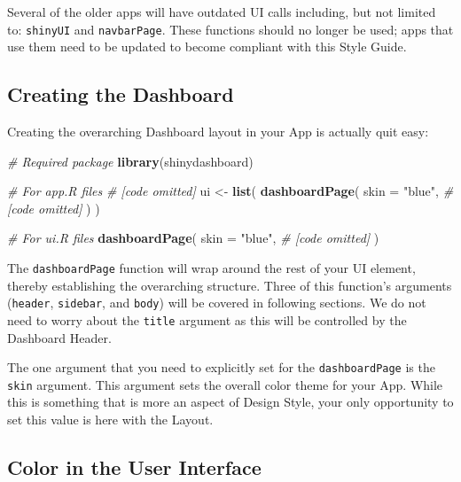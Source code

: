 \documentclass[
]{book}
\newenvironment{Shaded}{\begin{snugshade}}{\end{snugshade}}
\newcommand{\CommentTok}[1]{\textcolor[rgb]{0.56,0.35,0.01}{\textit{#1}}}
\newcommand{\DataTypeTok}[1]{\textcolor[rgb]{0.13,0.29,0.53}{#1}}
\newcommand{\KeywordTok}[1]{\textcolor[rgb]{0.13,0.29,0.53}{\textbf{#1}}}
\newcommand{\NormalTok}[1]{#1}
\newcommand{\StringTok}[1]{\textcolor[rgb]{0.31,0.60,0.02}{#1}}
\begin{document}
Several of the older apps will have outdated UI calls including, but not limited to: \texttt{shinyUI} and \texttt{navbarPage}. These functions should no longer be used; apps that use them need to be updated to become compliant with this Style Guide.

\hypertarget{creating-the-dashboard-1}{%
\subsection{Creating the Dashboard}\label{creating-the-dashboard-1}}

Creating the overarching Dashboard layout in your App is actually quit easy:

\begin{Shaded}
\begin{Highlighting}[]
\CommentTok{# Required package}
\KeywordTok{library}\NormalTok{(shinydashboard)}

\CommentTok{# For app.R files}
\CommentTok{# [code omitted]}
\NormalTok{ui <-}\StringTok{ }\KeywordTok{list}\NormalTok{(}
  \KeywordTok{dashboardPage}\NormalTok{(}
    \DataTypeTok{skin =} \StringTok{"blue"}\NormalTok{,}
    \CommentTok{# [code omitted]}
\NormalTok{  )}
\NormalTok{)}

\CommentTok{# For ui.R files}
\KeywordTok{dashboardPage}\NormalTok{(}
  \DataTypeTok{skin =} \StringTok{"blue"}\NormalTok{,}
  \CommentTok{# [code omitted]}
\NormalTok{)}
\end{Highlighting}
\end{Shaded}

The \texttt{dashboardPage} function will wrap around the rest of your UI element, thereby establishing the overarching structure. Three of this function's arguments (\texttt{header}, \texttt{sidebar}, and \texttt{body}) will be covered in following sections. We do not need to worry about the \texttt{title} argument as this will be controlled by the Dashboard Header.

The one argument that you need to explicitly set for the \texttt{dashboardPage} is the \texttt{skin} argument. This argument sets the overall color theme for your App. While this is something that is more an aspect of Design Style, your only opportunity to set this value is here with the Layout.

\hypertarget{colorUIb}{%
\subsection{Color in the User Interface}\label{colorUIb}}
\end{document}
